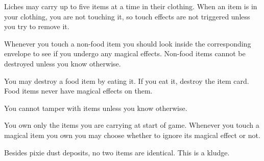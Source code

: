 \documentclass[green]{Sel}
\begin{document}
\name{\gItems{}}
Liches may carry up to five items at a time in their clothing. When an item is in your clothing, you are not touching it, so touch effects are not triggered unless you try to remove it. 

Whenever you touch a non-food item you should look inside the corresponding envelope to see if you undergo any magical effects. Non-food items cannot be destroyed unless you know otherwise.

You may destroy a food item by eating it. If you eat it, destroy the item card. Food items never have magical effects on them.

You cannot tamper with items unless you know otherwise.

You own only the items you are carrying at start of game. Whenever you touch a magical item you own you may choose whether to ignore its magical effect or not.

Besides pixie dust deposits, no two items are identical. This is a kludge.
\end{document}

